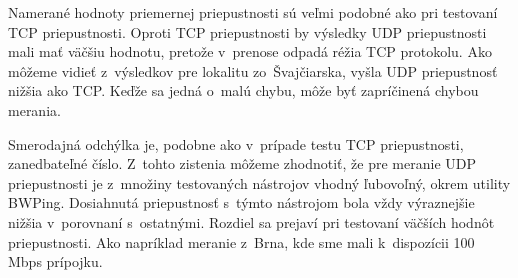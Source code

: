         Namerané hodnoty priemernej priepustnosti sú veľmi podobné ako pri
        testovaní TCP priepustnosti. Oproti TCP priepustnosti by výsledky UDP 
        priepustnosti mali mať väčšiu hodnotu, pretože v~prenose odpadá réžia
        TCP protokolu. Ako môžeme vidieť z~výsledkov pre lokalitu
        zo~Švajčiarska,
        vyšla UDP priepustnosť nižšia ako TCP. Keďže sa jedná o~malú chybu,
        môže byť zapríčinená chybou merania.
        
        Smerodajná odchýlka je, podobne ako v~prípade testu TCP priepustnosti,
        zanedbateľné číslo. Z~tohto zistenia môžeme zhodnotiť, že 
        pre meranie UDP priepustnosti je z~množiny testovaných nástrojov vhodný
        ľubovoľný, okrem utility BWPing. Dosiahnutá priepustnosť s~týmto
        nástrojom bola vždy výraznejšie nižšia v~porovnaní s~ostatnými.
        Rozdiel sa prejaví pri testovaní väčších hodnôt
        priepustnosti. Ako napríklad meranie z~Brna, kde sme mali k~dispozícii
        100 Mbps prípojku.

